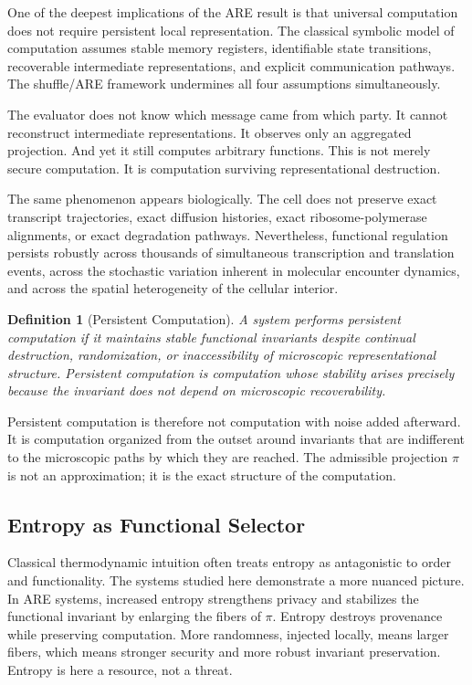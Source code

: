 \documentclass[12pt, a4paper]{article}
\theoremstyle{essaystyle}
\newtheorem{definition}{Definition}
\begin{document}
One of the deepest implications of the ARE result is that universal computation does
not require persistent local representation. The classical symbolic model of computation
assumes stable memory registers, identifiable state transitions, recoverable
intermediate representations, and explicit communication pathways. The shuffle/ARE
framework undermines all four assumptions simultaneously.

The evaluator does not know which message came from which party. It cannot reconstruct
intermediate representations. It observes only an aggregated projection. And yet it
still computes arbitrary functions. This is not merely secure computation. It is
computation surviving representational destruction.

The same phenomenon appears biologically. The cell does not preserve exact transcript
trajectories, exact diffusion histories, exact ribosome-polymerase alignments, or exact
degradation pathways. Nevertheless, functional regulation persists robustly across
thousands of simultaneous transcription and translation events, across the stochastic
variation inherent in molecular encounter dynamics, and across the spatial heterogeneity
of the cellular interior.

\begin{definition}[Persistent Computation]
A system performs \emph{persistent computation} if it maintains stable functional
invariants despite continual destruction, randomization, or inaccessibility of
microscopic representational structure. Persistent computation is computation whose
stability arises precisely because the invariant does not depend on microscopic
recoverability.
\end{definition}

Persistent computation is therefore not computation with noise added afterward. It is
computation organized from the outset around invariants that are indifferent to the
microscopic paths by which they are reached. The admissible projection $\pi$ is not an
approximation; it is the exact structure of the computation.

\subsection{Entropy as Functional Selector}

Classical thermodynamic intuition often treats entropy as antagonistic to order and
functionality. The systems studied here demonstrate a more nuanced picture. In ARE
systems, increased entropy strengthens privacy and stabilizes the functional invariant
by enlarging the fibers of $\pi$. Entropy destroys provenance while preserving
computation. More randomness, injected locally, means larger fibers, which means
stronger security and more robust invariant preservation. Entropy is here a resource,
not a threat.
\end{document}
